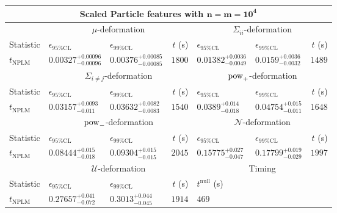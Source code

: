 \begin{tabular}{l|llr|llr}
	\toprule
	\multicolumn{7}{c}{{\bf Scaled Particle features with $\mathbf{n=m=10^{4}}$}} \\
	\toprule
	\multicolumn{1}{c}{} & \multicolumn{3}{c}{$\mu$-deformation} & \multicolumn{3}{c}{$\Sigma_{ii}$-deformation} \\
	Statistic & $\epsilon_{95\%\mathrm{CL}}$ & $\epsilon_{99\%\mathrm{CL}}$ & $t$ (s) & $\epsilon_{95\%\mathrm{CL}}$ & $\epsilon_{99\%\mathrm{CL}}$ & $t$ (s) \\
	\midrule
	$t_{\mathrm{NPLM}}$ & $0.00327_{-0.00096}^{+0.00096}$ & $0.00376_{-0.00085}^{+0.00085}$ & $1800$ & $0.01382_{-0.0049}^{+0.0036}$ & $0.0159_{-0.0032}^{+0.0036}$ & $1489$ \\
	\toprule
	\multicolumn{1}{c}{} & \multicolumn{3}{c}{$\Sigma_{i\neq j}$-deformation} & \multicolumn{3}{c}{$\rm{pow}_{+}$-deformation} \\
	Statistic & $\epsilon_{95\%\mathrm{CL}}$ & $\epsilon_{99\%\mathrm{CL}}$ & $t$ (s) & $\epsilon_{95\%\mathrm{CL}}$ & $\epsilon_{99\%\mathrm{CL}}$ & $t$ (s) \\
	\midrule
	$t_{\mathrm{NPLM}}$ & $0.03157_{-0.011}^{+0.0093}$ & $0.03632_{-0.0083}^{+0.0082}$ & $1540$ & $0.0389_{-0.018}^{+0.014}$ & $0.04754_{-0.011}^{+0.015}$ & $1648$ \\
	\toprule
	\multicolumn{1}{c}{} & \multicolumn{3}{c}{$\rm{pow}_{-}$-deformation} & \multicolumn{3}{c}{$\mathcal{N}$-deformation} \\
	Statistic & $\epsilon_{95\%\mathrm{CL}}$ & $\epsilon_{99\%\mathrm{CL}}$ & $t$ (s) & $\epsilon_{95\%\mathrm{CL}}$ & $\epsilon_{99\%\mathrm{CL}}$ & $t$ (s) \\
	\midrule
	$t_{\mathrm{NPLM}}$ & $0.08444_{-0.018}^{+0.015}$ & $0.09304_{-0.015}^{+0.015}$ & $2045$ & $0.15775_{-0.047}^{+0.027}$ & $0.17799_{-0.029}^{+0.019}$ & $1997$ \\
	\toprule
	\multicolumn{1}{c}{} & \multicolumn{3}{c}{$\mathcal{U}$-deformation} & \multicolumn{3}{c}{Timing} \\
	Statistic & $\epsilon_{95\%\mathrm{CL}}$ & $\epsilon_{99\%\mathrm{CL}}$ & $t$ (s) & $t^{\mathrm{null}}$ (s) \\
	\midrule
	$t_{\mathrm{NPLM}}$ & $0.27657_{-0.072}^{+0.041}$ & $0.3013_{-0.045}^{+0.044}$ & $1914$ & $469$ \\
	\bottomrule
\end{tabular}